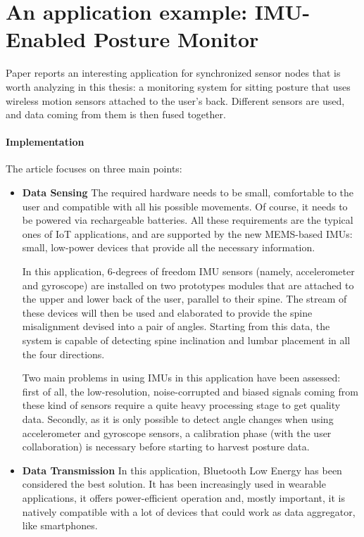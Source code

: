 \section{An application example: IMU-Enabled Posture Monitor}

Paper \cite{petropoulos2020wearable} reports an interesting application for synchronized sensor nodes that is worth analyzing in this thesis: a monitoring system for sitting posture that uses wireless motion sensors attached to the user's back. Different sensors are used, and data coming from them is then fused together.

\paragraph{Implementation} The article focuses on three main points:
\begin{itemize}
    \item \textbf{Data Sensing} The required hardware needs to be small, comfortable to the user and compatible with all his possible movements. Of course, it needs to be powered via rechargeable batteries. All these requirements are the typical ones of IoT applications, and are supported by the new MEMS-based IMUs: small, low-power devices that provide all the necessary information.

    In this application, 6-degrees of freedom IMU sensors (namely, accelerometer and gyroscope) are installed on two prototypes modules that are attached to the upper and lower back of the user, parallel to their spine. The stream of these devices will then be used and elaborated to provide the spine misalignment devised into a pair of angles. Starting from this data, the system is capable of detecting spine inclination and lumbar placement in all the four directions. 

    Two main problems in using IMUs in this application have been assessed: first of all, the low-resolution, noise-corrupted and biased signals coming from these kind of sensors require a quite heavy processing stage to get quality data. Secondly, as it is only possible to detect angle changes when using accelerometer and gyroscope sensors, a calibration phase (with the user collaboration) is necessary before starting to harvest posture data.

    \item \textbf{Data Transmission} In this application, Bluetooth Low Energy has been considered the best solution. It has been increasingly used in wearable applications, it offers power-efficient operation and, mostly important, it is natively compatible with a lot of devices that could work as data aggregator, like smartphones.


\end{itemize}
